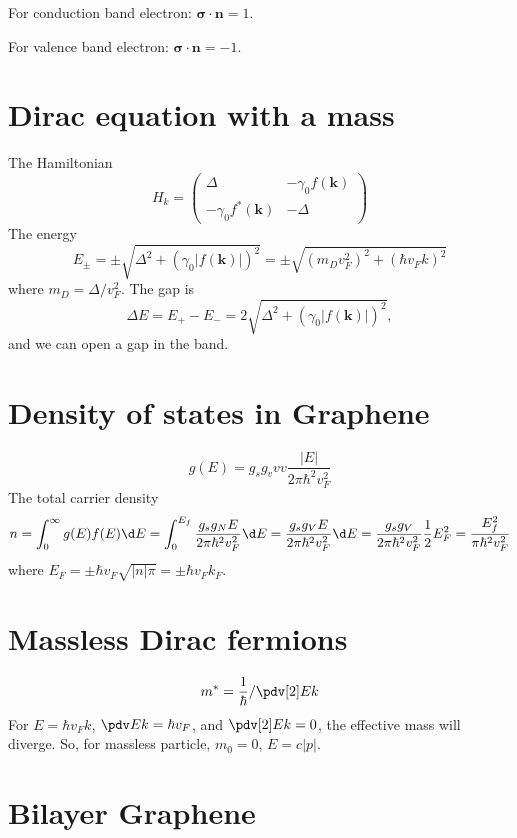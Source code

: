 \begin{enumext}
  \item For conduction band electron: $\bm\sigma \cdot \bm n = 1$.
  \item For valence band electron: $\bm\sigma \cdot \bm n = -1$.
\end{enumext}

\section{Dirac equation with a mass}

The Hamiltonian
\[
  H_k =
  \begin{pmatrix}
    \Delta & -\gamma_0f(\bm k)\\
    -\gamma_0f^*(\bm k) & -\Delta
  \end{pmatrix}
\]
The energy
\[
  E_\pm = \pm\sqrt{\Delta^2 + (\gamma_0|f(\bm k)|)^2}
= \pm \sqrt{(m_Dv_F^2)^2 + (\hbar v_Fk)^2}
\]
where $m_D = \Delta/v_F^2$.
The gap is
\[
  \Delta E = E_+ - E_-
= 2\sqrt{\Delta^2 + (\gamma_0|f(\bm k)|)^2},
\]
and we can open a gap in the band.

\section{Density of states in Graphene}

\[
  g(E) = g_sg_vvv \frac{|E|}{2\pi\hbar^2v_F^2}
\]
The total carrier density
\[
  n = \int_0^\infty g(E) f(E) \d E
= \int_0^{E_f} \frac{g_sg_N E}{2\pi\hbar^2v_F^2} \d E
= \frac{g_sg_VE}{2\pi\hbar^2v_F^2}\d E
= \frac{g_sg_V}{2\pi\hbar^2v_F^2} \frac12 E_F^2
= \frac{E_f^2}{\pi\hbar^2v_F^2}
\]
where $E_F = \pm\hbar v_F\sqrt{|n|\pi} = \pm\hbar v_Fk_F$.

\section{Massless Dirac fermions}

\[
  m^* = \frac1\hbar/\pdv[2]Ek
\]
For $E = \hbar v_F k$, $\pdv Ek = \hbar v_F$, and $\pdv[2]Ek = 0$,
the effective mass will diverge.
So, for massless particle, $m_0 = 0$, $E = c|p|$.

\section{Bilayer Graphene}

